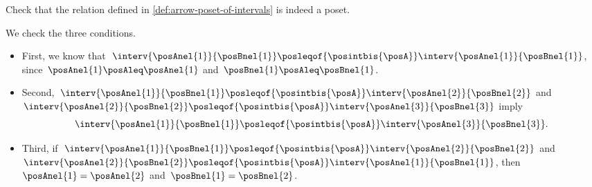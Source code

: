 \begin{exercise}
    Check that the relation defined in \cref{def:arrow-poset-of-intervals} is indeed a poset.
\end{exercise}
\begin{solution}
    We check the three conditions.
    \begin{itemize}
        \item First, we know that~$\interv{\posAnel{1}}{\posBnel{1}}\posleqof{\posintbis{\posA}}\interv{\posAnel{1}}{\posBnel{1}}$, since~$\posAnel{1}\posAleq \posAnel{1}$ and~$\posBnel{1}\posAleq \posBnel{1}$.
        \item Second,~$\interv{\posAnel{1}}{\posBnel{1}}\posleqof{\posintbis{\posA}}\interv{\posAnel{2}}{\posBnel{2}}$ and~$\interv{\posAnel{2}}{\posBnel{2}}\posleqof{\posintbis{\posA}}\interv{\posAnel{3}}{\posBnel{3}}$ imply
              \begin{equation}
                  \interv{\posAnel{1}}{\posBnel{1}}\posleqof{\posintbis{\posA}}\interv{\posAnel{3}}{\posBnel{3}}.
              \end{equation}
        \item Third, if~$\interv{\posAnel{1}}{\posBnel{1}}\posleqof{\posintbis{\posA}}\interv{\posAnel{2}}{\posBnel{2}}$ and~$\interv{\posAnel{2}}{\posBnel{2}}\posleqof{\posintbis{\posA}}\interv{\posAnel{1}}{\posBnel{1}}$, then~$\posAnel{1}=\posAnel{2}$ and~$\posBnel{1}=\posBnel{2}$.
    \end{itemize}
\end{solution}

